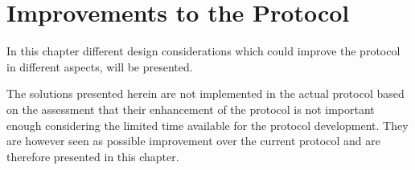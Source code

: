 \chapter{Improvements to the Protocol}\label{mortenStuff}
In this chapter different design considerations which could improve the protocol in different aspects, will be presented.

The solutions presented herein are not implemented in the actual protocol based on the assessment that their enhancement of the protocol is not important enough considering the limited time available for the protocol development. 
They are however seen as possible improvement over the current protocol and are therefore presented in this chapter. 



